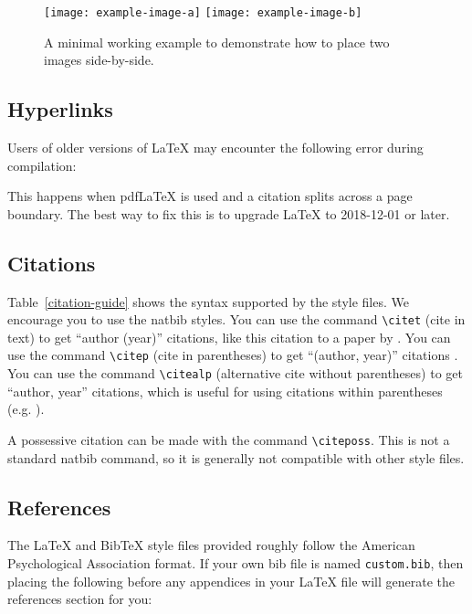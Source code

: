 \documentclass[11pt]{article}
\begin{document}
\begin{figure*}[t]
  \texttt{[image: example-image-a]} \hfill
  \texttt{[image: example-image-b]}
  \caption {A minimal working example to demonstrate how to place
    two images side-by-side.}
\end{figure*}

\subsection{Hyperlinks}

Users of older versions of \LaTeX{} may encounter the following error during compilation:
\begin{quote}
\end{quote}
This happens when pdf\LaTeX{} is used and a citation splits across a page boundary. The best way to fix this is to upgrade \LaTeX{} to 2018-12-01 or later.

\subsection{Citations}


Table~\ref{citation-guide} shows the syntax supported by the style files.
We encourage you to use the natbib styles.
You can use the command \verb|\citet| (cite in text) to get ``author (year)'' citations, like this citation to a paper by \citet{Gusfield:97}.
You can use the command \verb|\citep| (cite in parentheses) to get ``(author, year)'' citations \citep{Gusfield:97}.
You can use the command \verb|\citealp| (alternative cite without parentheses) to get ``author, year'' citations, which is useful for using citations within parentheses (e.g. \citealp{Gusfield:97}).

A possessive citation can be made with the command \verb|\citeposs|.
This is not a standard natbib command, so it is generally not compatible
with other style files.

\subsection{References}

\nocite{Ando2005,andrew2007scalable,rasooli-tetrault-2015,Gusfield:97}

The \LaTeX{} and Bib\TeX{} style files provided roughly follow the American Psychological Association format.
If your own bib file is named \texttt{custom.bib}, then placing the following before any appendices in your \LaTeX{} file will generate the references section for you:
\begin{quote}
\begin{verbatim}

\end{verbatim}
\end{quote}
\end{document}
